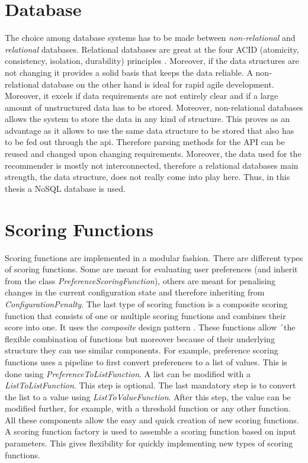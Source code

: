 \section{Database}
\label{sec:DesignImplementation:Database}

The choice among database systems has to be made between \emph{non-relational} and \emph{relational} databases. Relational databases are great at the four ACID (atomicity, consistency, isolation, durability) principles \cite{chrysanthis1998recovery, cookACIDBASEDatabase2009}. Moreover, if the data structures are not changing it provides a solid basis that keeps the data reliable. A non-relational database on the other hand is ideal for rapid agile development. Moreover, it excels if data requirements are not entirely clear and if a large amount of unstructured  data has to be stored. Moreover, non-relational databases allows the system to store the data in any kind of structure. This proves as an advantage as it allows to use the same data structure to be stored that also has to be fed out through the api. Therefore parsing methods for the API can be reused and changed upon changing requirements. Moreover, the data used for the recommender is mostly not interconnected, therefore a relational databases main strength, the data structure, does not really come into play here. Thus, in this thesis a NoSQL database is used. 

\section{Scoring Functions}
\label{sec:DesignImplementation:ScroingFunctions}

Scoring functions are implemented in a modular fashion. There are different types of scoring functions. Some are meant for evaluating user preferences (and inherit from the class \emph{PreferenceScoringFunction}), others are meant for penalising changes in the current configuration state and therefore inheriting from  \emph{ConfigurationPenalty}. The last type of scoring function is a composite scoring function that consists of one or multiple scoring functions and combines their score into one. It uses the \emph{composite} design pattern . These functions allow ´the flexible combination of functions but moreover because of their underlying structure they can use similar components. For example, preference scoring functions uses a pipeline to first convert preferences to a list of values. This is done using \emph{PreferenceToListFunction}. A list can be modified with a \emph{ListToListFunction}. This step is optional. The last mandatory step is to convert the list to a value using \emph{ListToValueFunction}. After this step, the value can be modified further, for example, with a threshold function or any other function. All these components allow the easy and quick creation of new scoring functions. A scoring function factory is used to assemble a scoring function based on input parameters. This gives flexibility for quickly implementing new types of scoring functions.



